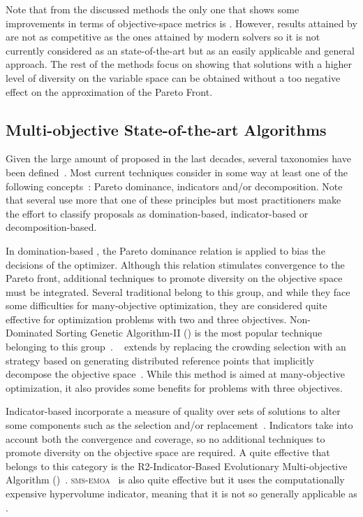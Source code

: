 Note that from the discussed methods the only one that shows some improvements in terms of objective-space metrics is \GDEA{}.
%
However, results attained by \GDEA{} are not as competitive as the ones attained by modern solvers so it is not currently
considered as an state-of-the-art \MOEA{} but as an easily applicable and general approach.
%
The rest of the methods focus on showing that solutions with a higher level of diversity on the variable space
can be obtained without a too negative effect
on the approximation of the Pareto Front.


\subsection{Multi-objective State-of-the-art Algorithms}

Given the large amount of \MOEAS{} proposed in the last decades, several taxonomies have been defined~\cite{bechikh2016recent}.
%
Most current techniques consider in some way at least one of the following concepts~\cite{trivedi2016survey}:
Pareto dominance, indicators and/or decomposition.
%
Note that several \MOEAS{} use more that one of these principles but most practitioners make the effort to classify
proposals as domination-based, indicator-based or decomposition-based.

In domination-based \MOEAS{}, the Pareto dominance relation is applied to bias the decisions of the optimizer.
%
Although this relation stimulates convergence to the Pareto front, additional techniques to promote
diversity on the objective space must be integrated.
%
Several traditional \MOEAS{} belong to this group, and while they face some difficulties for many-objective
optimization, they are considered quite effective for optimization problems with two and three objectives.
%
Non-Dominated Sorting Genetic Algorithm-II (\NSGAII{}) is the most popular technique belonging to this group~\cite{deb2002fast}.
%
\NSGAIII{}~\cite{deb2013evolutionary} extends \NSGAII{} by replacing the crowding selection with an strategy 
based on generating distributed reference points that implicitly decompose the objective space~\cite{trivedi2016survey}.
%
While this method is aimed at many-objective optimization, it also provides some benefits for problems with three objectives.

Indicator-based \MOEAS{} incorporate a measure of quality over sets of solutions to alter some components such as the 
selection and/or replacement~\cite{zitzler2004indicator}.
%
Indicators take into account both the convergence and coverage, so no additional techniques to promote diversity
on the objective space are required.
%
A quite effective \MOEA{} that belongs to this category is the R2-Indicator-Based Evolutionary Multi-objective 
Algorithm (\RMOEA{})~\cite{trautmann2013r2}.
%
\textsc{sms-emoa}~\cite{beume:07} is also quite effective 
but it uses the computationally expensive hypervolume indicator, meaning that it is not so generally applicable as \RMOEA{}.

